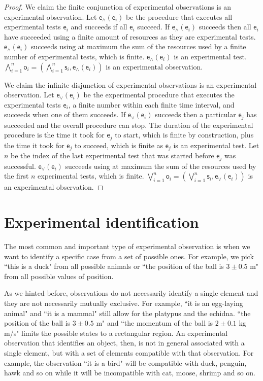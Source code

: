 \documentclass[11pt,letterpaper,fleqn]{memoir} %
\begin{document}
\begin{proof}
	We claim the finite conjunction of experimental observations is an experimental observation. Let $\mathsf{e}_{\wedge}(\mathsf{e}_i)$ be the procedure that executes all experimental tests $\mathsf{e}_i$ and succeeds if all $\mathsf{e}_i$ succeed. If $\mathsf{e}_{\wedge}(\mathsf{e}_i)$ succeeds then all $\mathsf{e}_i$ have succeeded using a finite amount of resources as they are experimental tests. $\mathsf{e}_{\wedge}(\mathsf{e}_i)$ succeeds using at maximum the sum of the resources used by a finite number of experimental tests, which is finite. $\mathsf{e}_{\wedge}(\mathsf{e}_i)$ is an experimental test. $\bigwedge\limits_{i=1}^{n} \mathsf{o}_i = (\bigwedge\limits_{i=1}^{n} \mathsf{s}_i, \mathsf{e}_{\wedge}(\mathsf{e}_i))$ is an experimental observation.
	
	We claim the infinite disjunction of experimental observations is an experimental observation. Let $\mathsf{e}_{\vee}(\mathsf{e}_i)$ be the experimental procedure that executes the experimental tests $\mathsf{e}_i$, a finite number within each finite time interval, and succeeds when one of them succeeds. If $\mathsf{e}_{\vee}(\mathsf{e}_i)$ succeeds then a particular $\mathsf{e}_j$ has succeeded and the overall procedure can stop. The duration of the experimental procedure is the time it took for $\mathsf{e}_j$ to start, which is finite by construction, plus the time it took for $\mathsf{e}_j$ to succeed, which is finite as $\mathsf{e}_j$ is an experimental test. Let $n$ be the index of the last experimental test that was started before $\mathsf{e}_j$ was successful. $\mathsf{e}_{\vee}(\mathsf{e}_i)$ succeeds using at maximum the sum of the resources used by the first $n$ experimental tests, which is finite. $\bigvee\limits_{i=1}^{n} \mathsf{o}_i = (\bigvee\limits_{i=1}^{n} \mathsf{s}_i, \mathsf{e}_{\vee}(\mathsf{e}_i))$ is an experimental observation.
\end{proof}

\section{Experimental identification}

The most common and important type of experimental observation is when we want to identify a specific case from a set of possible ones. For example, we pick ``this is a duck" from all possible animals or ``the position of the ball is $3 \pm 0.5$ m" from all possible values of position.

As we hinted before, observations do not necessarily identify a single element and they are not necessarily mutually exclusive. For example, ``it is an egg-laying animal" and ``it is a mammal" still allow for the platypus and the echidna. ``the position of the ball is $3 \pm 0.5$ m" and ``the momentum of the ball is $2 \pm 0.1$ kg m/s" limits the possible states to a rectangular region. An experimental observation that identifies an object, then, is not in general associated with a single element, but with a set of elements compatible with that observation. For example, the observation ``it is a bird" will be compatible with duck, penguin, hawk and so on while it will be incompatible with cat, moose, shrimp and so on.
\end{document}
